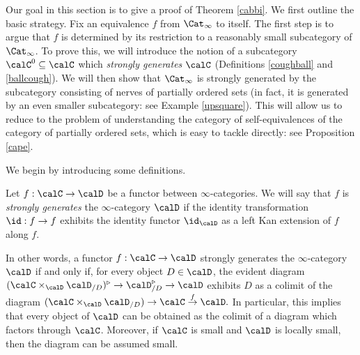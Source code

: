 Our goal in this section is to give a proof of Theorem \ref{cabbi}. We first outline the basic strategy. Fix an equivalence $f$ from $\Cat_{\infty}$ to itself. The first step is to argue that $f$ is determined by its restriction to a reasonably small subcategory of $\Cat_{\infty}$. To prove this, we will introduce the notion of a subcategory $\calC^{0} \subseteq \calC$ which {\it strongly generates} $\calC$
(Definitions \ref{coughball} and \ref{ballcough}). We will then show that $\Cat_{\infty}$ is strongly generated by the subcategory consisting of nerves of partially ordered sets (in fact, it is generated
by an even smaller subcategory: see Example \ref{upsquare}). This will allow us to reduce to the problem of understanding the category of self-equivalences of the category of partially ordered sets, which is easy to tackle directly: see Proposition \ref{cape}. 

We begin by introducing some definitions.

\begin{definition}\label{coughball}
Let $f: \calC \rightarrow \calD$ be a functor between $\infty$-categories.
We will say that $f$ is {\em strongly generates} the $\infty$-category $\calD$ if the identity transformation
$\id: f \rightarrow f$ exhibits the identity functor $\id_{\calD}$ as a left Kan extension of $f$
along $f$.
\end{definition}

\begin{remark}
In other words, a functor $f: \calC \rightarrow \calD$ strongly generates the $\infty$-category
$\calD$ if and only if, for every object $D \in \calD$, the evident diagram
$( \calC \times_{\calD} \calD_{/D} )^{\triangleright} \rightarrow \calD_{/D}^{\triangleright} \rightarrow \calD$
exhibits $D$ as a colimit of the diagram
$(\calC \times_{\calD} \calD_{/D}) \rightarrow \calC \stackrel{f}{\rightarrow} \calD.$
In particular, this implies that every object of $\calD$ can be obtained as the colimit of a diagram
which factors through $\calC$. Moreover, if $\calC$ is small and $\calD$ is locally small, then the diagram can be assumed small.
\end{remark}

